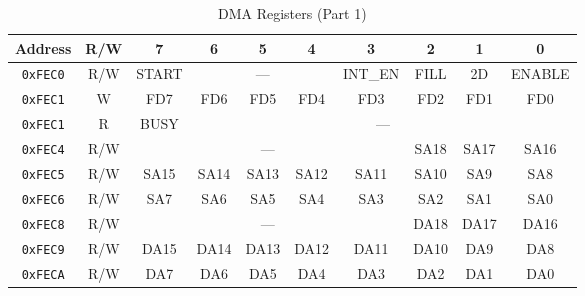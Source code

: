 \begin{table}[ht]
    \begin{center}
        \begin{tabular}{|c|c|c|c|c|c|c|c|c|c|} \hline
            Address & R/W & 7 & 6 & 5 & 4 & 3 & 2 & 1 & 0 \\\hline\hline
            \verb+0xFEC0+ & R/W & START & \multicolumn{3}{|c|}{---} & INT\_EN & FILL & 2D & ENABLE \\ \hline
            \verb+0xFEC1+ & W & FD7 & FD6 & FD5 & FD4 & FD3 & FD2 & FD1 & FD0 \\ \hline
            \verb+0xFEC1+ & R & BUSY & \multicolumn{7}{|c|}{---}  \\ \hline\hline

            \verb+0xFEC4+ & R/W & \multicolumn{5}{|c|}{---} & SA18 & SA17 & SA16 \\ \hline\hline
            \verb+0xFEC5+ & R/W & SA15 & SA14 & SA13 & SA12 & SA11 & SA10 & SA9 & SA8 \\ \hline
            \verb+0xFEC6+ & R/W & SA7 & SA6 & SA5 & SA4 & SA3 & SA2 & SA1 & SA0 \\ \hline

            \verb+0xFEC8+ & R/W & \multicolumn{5}{|c|}{---} & DA18 & DA17 & DA16 \\ \hline
            \verb+0xFEC9+ & R/W & DA15 & DA14 & DA13 & DA12 & DA11 & DA10 & DA9 & DA8 \\ \hline
            \verb+0xFECA+ & R/W & DA7 & DA6 & DA5 & DA4 & DA3 & DA2 & DA1 & DA0 \\ \hline
        \end{tabular}
    \end{center}
    \caption{DMA Registers (Part 1)}
    \label{tab:dma_reg}
\end{table}

